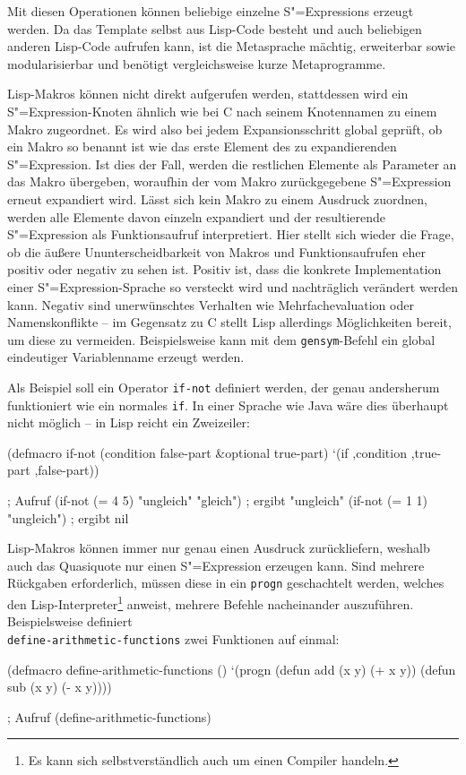 \documentclass[11pt, a4paper, bibgerm]{scrbook}
\newenvironment{DIFnomarkup}{}{}
\newcommand\icode[1]{\lstinline?#1?}
\newcommand{\sexp}{S"=Expression}
\newcommand{\sexps}{S"=Expressions}
\begin{document}
Mit diesen Operationen können beliebige einzelne \sexps{} erzeugt
werden. Da das Template selbst aus Lisp-Code besteht und auch beliebigen
anderen Lisp-Code aufrufen kann, ist die Metasprache mächtig,
erweiterbar sowie modularisierbar und benötigt vergleichsweise kurze
Metaprogramme.

Lisp-Makros können nicht direkt aufgerufen werden, stattdessen wird ein
\sexp{}-Knoten ähnlich wie bei C nach seinem Knotennamen zu einem Makro
zugeordnet. Es wird also bei jedem Expansionsschritt global geprüft, ob
ein Makro so benannt ist wie das erste Element des zu expandierenden
\sexp{}. Ist dies der Fall, werden die restlichen Elemente als Parameter
an das Makro übergeben, woraufhin der vom Makro zurückgegebene \sexp{}
erneut expandiert wird. Lässt sich kein Makro zu einem Ausdruck
zuordnen, werden alle Elemente davon einzeln expandiert und der
resultierende \sexp{} als Funktionsaufruf interpretiert. Hier stellt
sich wieder die Frage, ob die äußere Ununterscheidbarkeit von Makros und
Funktionsaufrufen eher positiv oder negativ zu sehen ist. Positiv ist,
dass die konkrete Implementation einer \sexp{}-Sprache so versteckt wird
und nachträglich verändert werden kann. Negativ sind unerwünschtes
Verhalten wie Mehrfachevaluation oder Namenskonflikte -- im Gegensatz zu
C stellt Lisp allerdings Möglichkeiten bereit, um diese zu
vermeiden. Beispielsweise kann mit dem \icode{gensym}-Befehl ein global
eindeutiger Variablenname erzeugt werden.

Als Beispiel soll ein Operator \icode{if-not} definiert werden, der
genau andersherum funktioniert wie ein normales \icode{if}. In einer
Sprache wie Java wäre dies überhaupt nicht möglich -- in Lisp reicht ein
Zweizeiler:

\begin{code}
(defmacro if-not (condition false-part &optional true-part)
  `(if ,condition ,true-part ,false-part))

; Aufruf
(if-not (= 4 5) "ungleich" "gleich")  ; ergibt "ungleich"  
(if-not (= 1 1) "ungleich")           ; ergibt nil
\end{code}

Lisp-Makros können immer nur genau einen Ausdruck zurückliefern, weshalb
auch das Quasiquote nur einen \sexp{} erzeugen kann. Sind mehrere
Rückgaben erforderlich, müssen diese in ein \icode{progn} geschachtelt
werden, welches den Lisp-Interpreter\footnote{Es kann sich
  selbstverständlich auch um einen Compiler handeln.} anweist, mehrere
Befehle nacheinander auszuführen. Beispielsweise definiert \\
\icode{define-arithmetic-functions} zwei Funktionen auf einmal:
\begin{DIFnomarkup}\begin{code}
(defmacro define-arithmetic-functions ()
  `(progn (defun add (x y) (+ x y))
          (defun sub (x y) (- x y))))


; Aufruf
(define-arithmetic-functions)
\end{code}\end{DIFnomarkup}
\end{document}
